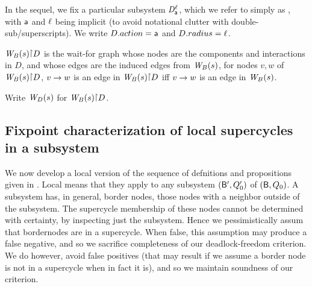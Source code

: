 In the sequel, we fix a particular subsystem $\dsk{\act}{\l}$, which
we refer to simply as \DS, with $\act$ and $\l$ being implicit (to
avoid notational clutter with double-sub/superscripts). 
We write $\DS.action = \act$ and $\DS.radius = \l$. 


\begin{definition} \label{defn:projWgraph}
$\wfg{B}{s} \pj \DS$ is the wait-for graph whose nodes are the
components and interactions in $D$, and whose edges are the induced
edges from $\wfg{B}{s}$, \ie for nodes $v, w$ of $\wfg{B}{s} \pj \DS$,
$v \ar w$ is an edge in $\wfg{B}{s} \pj \DS$ iff $v \ar w$ is an edge in $\wfg{B}{s}$.

Write $\lwfg{B}{s}{\DS}$ for $\wfg{B}{s} \pj \DS$.
\end{definition}


%
\subsection{Fixpoint characterization of  local supercycles in a  subsystem}
\label{s:local.fixpoint}

We now develop a local version of the sequence of defnitions and propositions given in .  Local means that they apply to any
subsystem $(\B', Q'_0)$ of $(\B, Q_0)$. A subsystem has, in general, border nodes, \ie those nodes with a neighbor outside of the
subsystem. The supercycle membership of these nodes cannot be determined with certainty, by inspecting just the subsystem.
Hence we pessimistically assum that bordernodes are in a supercycle. When false, this assumption may produce a false negative, and so we sacrifice
completeness of our deadlock-freedom criterion. We do however, avoid false positives (that may result if we assume a border node is not in a supercycle when in fact it
is), and so we maintain soundness of our criterion. 


